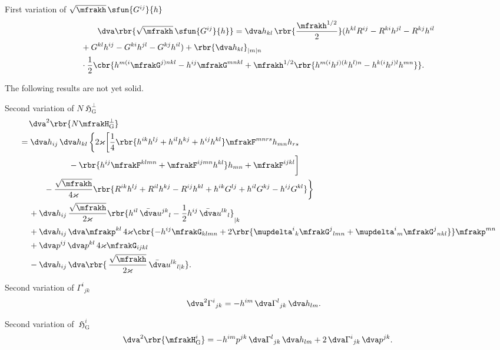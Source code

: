 \documentclass[a4paper,11pt]{article}
\begin{document}
First variation of $\sqrt{\mfrakh}\,\sfun{G^{ij}}{h}$
\begin{align}
&\qquad
\dva\rbr{\sqrt{\mfrakh}\,\sfun{G^{ij}}{h}}
= \dva h_{kl}\,\rbr{\frac{\mfrakh^{1/2}}{2}}
(h^{kl}R^{ij}-R^{ki}h^{jl}-R^{kj}h^{il}
\nonumber \\
&+
G^{kl}h^{ij}-G^{ki}h^{jl}-G^{kj}h^{il}) +
\rbr{\dva h_{kl}}_{|m|n}
\nonumber \\
&\cdot
\frac{1}{2}
\cbr{h^{m(i}\mfrakG^{j)nkl} - h^{ij}\mfrakG^{mnkl} +
\mfrakh^{1/2}\rbr{h^{m(i}h^{j)(k}h^{l)n} - h^{k(i}h^{j)l}h^{mn}}}.
\end{align}

The following results are not yet solid.

Second variation of $N \mfrakH_\text{G}^\perp$
\begin{align}
&\quad\,
\dva^2\rbr{N \mfrakH_\text{G}^\perp}
\nonumber \\
&= \dva h_{ij}\,\dva h_{kl}\,\bigg\{ 2\varkappa\bigg[
\frac{1}{4}\rbr{h^{ik}h^{lj}+h^{il}h^{kj}+h^{ij}h^{kl}} \mfrakF^{mnrs} 
h_{mn} h_{rs}
\nonumber \\
&\qquad\qquad\qquad
-\rbr{h^{ij}\mfrakF^{klmn}+\mfrakF^{ijmn}h^{kl}}h_{mn}
+\mfrakF^{ijkl} \bigg]
\nonumber \\
&\qquad\quad
-\frac{\sqrt{\mfrakh}}{4\varkappa}\rbr{
R^{ik}h^{lj}+R^{il}h^{kj}-R^{ij}h^{kl}+h^{ik}G^{lj}+h^{il}G^{kj}-h^{ij}G^{kl}}
\bigg\}
\nonumber \\
&\quad\,
+\dva h_{ij}\,\frac{\sqrt{\mfrakh}}{2\varkappa}
\rbr{h^{il}\,\bar{\dva}u^{jk}{}_{l}
- \frac{1}{2}h^{ij}\,\bar{\dva}u^{lk}{}_{l}}_{|k} 
\nonumber \\
&\quad\,
+\dva h_{ij}\,\dva \mfrakp^{kl}\,4\varkappa
\cbr{-h^{ij}\mfrakG_{klmn}+2\rbr{\mupdelta^i{}_k\mfrakG^{j}{}_{lmn} 
+\mupdelta^i{}_m\mfrakG^{j}{}_{nkl}} } \mfrakp^{mn}
\nonumber \\
&\quad\,
+\dva p^{ij}\,\dva p^{kl}\,4\varkappa \mfrakG_{ijkl}
\nonumber \\
&\quad\,
-\dva h_{ij}\,
\dva\rbr{\,\frac{\sqrt{\mfrakh}}{2\varkappa}\,\bar{\dva}u^{lk}{}_{l|k}}.
\end{align}

Second variation of $\Gamma^i{}_{jk}$
\begin{align}
\dva^2 \Gamma^i{}_{jk} &=
- h^{im} \,\dva\Gamma^{l}{}_{jk} \,\dva h_{lm}.
\end{align}

Second variation of $\mfrakH_\text{G}^i$
\begin{align}
\dva^2\rbr{\mfrakH_\text{G}^i} = -h^{im}p^{jk}
\,\dva\Gamma^{l}{}_{jk}\,\dva h_{lm} + 2\,\dva\Gamma^{i}{}_{jk}\,\dva p^{jk}.
\end{align}
\end{document}
